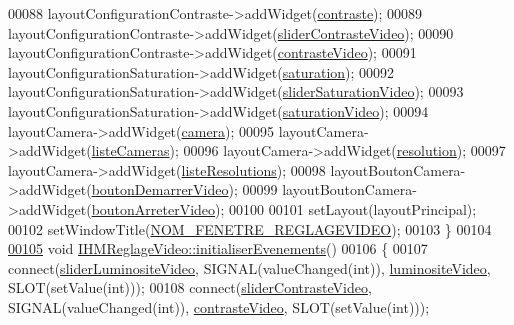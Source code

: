 \begin{DoxyCode}
00088     layoutConfigurationContraste->addWidget(\hyperlink{class_i_h_m_reglage_video_ad1aa173a98ced9f3aaeccb0c2712093c}{contraste});
00089     layoutConfigurationContraste->addWidget(\hyperlink{class_i_h_m_reglage_video_a69917b4179132a63efe6c3fb63ba666a}{sliderContrasteVideo});
00090     layoutConfigurationContraste->addWidget(\hyperlink{class_i_h_m_reglage_video_a617e9dbd5a92c35e7e351228354deb63}{contrasteVideo});
00091     layoutConfigurationSaturation->addWidget(\hyperlink{class_i_h_m_reglage_video_a452450793da1908cfe89fb9984b914d1}{saturation});
00092     layoutConfigurationSaturation->addWidget(\hyperlink{class_i_h_m_reglage_video_aba60de0eccec35f165101b10c0cd33df}{sliderSaturationVideo});
00093     layoutConfigurationSaturation->addWidget(\hyperlink{class_i_h_m_reglage_video_a058bd2a65aefa5f95ff73851f156064c}{saturationVideo});
00094     layoutCamera->addWidget(\hyperlink{class_i_h_m_reglage_video_a5a57047117d423ba8bf62bbcb2baee74}{camera});
00095     layoutCamera->addWidget(\hyperlink{class_i_h_m_reglage_video_a38a35548ddd0e5750917305ac6f32142}{listeCameras});
00096     layoutCamera->addWidget(\hyperlink{class_i_h_m_reglage_video_a7fd79309e9501b8cb340ae61b96c0366}{resolution});
00097     layoutCamera->addWidget(\hyperlink{class_i_h_m_reglage_video_ad897355a4350d95f5f219db57ff68d4f}{listeResolutions});
00098     layoutBoutonCamera->addWidget(\hyperlink{class_i_h_m_reglage_video_a98d33390551ab92165f192be44f6361d}{boutonDemarrerVideo});
00099     layoutBoutonCamera->addWidget(\hyperlink{class_i_h_m_reglage_video_a705db68dd445a91a4144a3c9bf95a9cf}{boutonArreterVideo});
00100 
00101     setLayout(layoutPrincipal);
00102     setWindowTitle(\hyperlink{ihmreglagevideo_8h_a4a739fa13f7cc257ce61e04383ed8a9a}{NOM\_FENETRE\_REGLAGEVIDEO});
00103 \}
00104 
\hyperlink{class_i_h_m_reglage_video_a4576b1b6ccfcabf6b2b39d37db2dd248}{00105} \textcolor{keywordtype}{void} \hyperlink{class_i_h_m_reglage_video_a4576b1b6ccfcabf6b2b39d37db2dd248}{IHMReglageVideo::initialiserEvenements}()
00106 \{
00107     connect(\hyperlink{class_i_h_m_reglage_video_a333b7f1b3239abd5823e0b0f2857716b}{sliderLuminositeVideo}, SIGNAL(valueChanged(\textcolor{keywordtype}{int})), 
      \hyperlink{class_i_h_m_reglage_video_a9109c0801d582917e78e57c350510ea7}{luminositeVideo}, SLOT(setValue(\textcolor{keywordtype}{int})));
00108     connect(\hyperlink{class_i_h_m_reglage_video_a69917b4179132a63efe6c3fb63ba666a}{sliderContrasteVideo}, SIGNAL(valueChanged(\textcolor{keywordtype}{int})), 
      \hyperlink{class_i_h_m_reglage_video_a617e9dbd5a92c35e7e351228354deb63}{contrasteVideo}, SLOT(setValue(\textcolor{keywordtype}{int})));

\end{DoxyCode}
